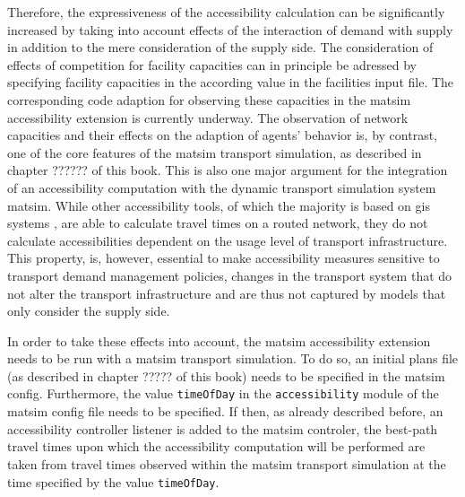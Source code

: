 Therefore, the expressiveness of the accessibility calculation can be significantly increased by taking into account 
effects of the interaction of demand with supply in addition to the mere consideration of the supply side. The consideration
of effects of competition for facility capacities can in principle be adressed by specifying facility capacities in the 
according value in the facilities input file. The corresponding code adaption for observing these capacities in the \gls{matsim} 
accessibility extension is currently underway. The observation of network capacities and 
their effects on the adaption of agents' behavior is, by contrast, one of the core features of the \gls{matsim} transport 
simulation, as described in chapter ?????? of this book. 
This is also one major argument for the integration of an 
accessibility computation with the dynamic transport simulation system \gls{matsim}. While other accessibility tools, of 
which the majority is based on \gls{gis} systems
\citep{BBSR20xxErreichbarkeitsmodell, CurtisEtAl2013AccessibilityPolicyInnovation, BuettnerEtAl2010Erreichbarkeitsatlas, LiuZhu2004AccessibilityAnalyst, GulhanEtAl2014PotentialAccessibilityMeasureDenizli}, are able to calculate travel times 
on a routed network, they do not calculate accessibilities dependent on the usage level of transport infrastructure. 
This property, is, however, essential to make accessibility measures sensitive to transport demand management policies, 
\ie changes in the transport system that do not alter the transport infrastructure and are thus not captured by models 
that only consider the supply side.


In order to take these effects into account, the \gls{matsim} accessibility extension needs to be run with a \gls{matsim} 
transport simulation. To do so, an initial plans file (as described in chapter ????? of this book) 
needs to be specified 
in the \gls{matsim} config. Furthermore, the value \lstinline{timeOfDay} in the \lstinline{accessibility} module of the \gls{matsim}
config file needs to be specified. If then, as already described before, an accessibility controller listener is added to 
the \gls{matsim} controler, the best-path travel times upon which the accessibility computation will be performed are taken 
from travel times observed within the \gls{matsim} transport simulation at the time specified by the value \lstinline{timeOfDay}.

